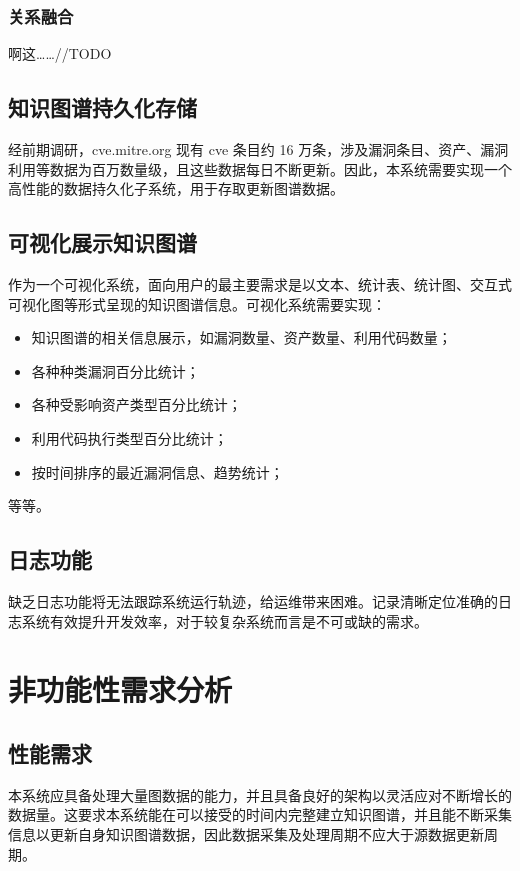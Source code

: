 \documentclass[a4paper,AutoFakeBold,oneside,12pt]{book}
\begin{document}
\subsubsection{关系融合}

啊这……//TODO

\subsection{知识图谱持久化存储}

经前期调研，cve.mitre.org 现有 cve 条目约 16 万条，涉及漏洞条目、资产、漏洞利用等数据为百万数量级，且这些数据每日不断更新。因此，本系统需要实现一个高性能的数据持久化子系统，用于存取更新图谱数据。

\subsection{可视化展示知识图谱}

作为一个可视化系统，面向用户的最主要需求是以文本、统计表、统计图、交互式可视化图等形式呈现的知识图谱信息。可视化系统需要实现：
\begin{itemize}
	\item 知识图谱的相关信息展示，如漏洞数量、资产数量、利用代码数量；
	\item 各种种类漏洞百分比统计；
	\item 各种受影响资产类型百分比统计；
	\item 利用代码执行类型百分比统计；
	\item 按时间排序的最近漏洞信息、趋势统计；
\end{itemize}
等等。

\subsection{日志功能}

缺乏日志功能将无法跟踪系统运行轨迹，给运维带来困难。记录清晰定位准确的日志系统有效提升开发效率，对于较复杂系统而言是不可或缺的需求。

\section{非功能性需求分析}

\subsection{性能需求}

本系统应具备处理大量图数据的能力，并且具备良好的架构以灵活应对不断增长的数据量。这要求本系统能在可以接受的时间内完整建立知识图谱，并且能不断采集信息以更新自身知识图谱数据，因此数据采集及处理周期不应大于源数据更新周期。
\end{document}
